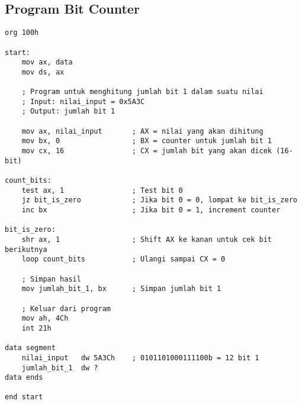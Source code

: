 \documentclass[../main.tex]{subfiles}
\begin{document}
\subsection{Program Bit Counter}
\begin{lstlisting}[language={[x86masm]Assembler}, caption=Program Penghitung Bit, label={lst:bit-counter-program}]
org 100h

start:
    mov ax, data
    mov ds, ax
    
    ; Program untuk menghitung jumlah bit 1 dalam suatu nilai
    ; Input: nilai_input = 0x5A3C
    ; Output: jumlah bit 1
    
    mov ax, nilai_input       ; AX = nilai yang akan dihitung
    mov bx, 0                 ; BX = counter untuk jumlah bit 1
    mov cx, 16                ; CX = jumlah bit yang akan dicek (16-bit)
    
count_bits:
    test ax, 1                ; Test bit 0
    jz bit_is_zero            ; Jika bit 0 = 0, lompat ke bit_is_zero
    inc bx                    ; Jika bit 0 = 1, increment counter
    
bit_is_zero:
    shr ax, 1                 ; Shift AX ke kanan untuk cek bit berikutnya
    loop count_bits           ; Ulangi sampai CX = 0
    
    ; Simpan hasil
    mov jumlah_bit_1, bx      ; Simpan jumlah bit 1
    
    ; Keluar dari program
    mov ah, 4Ch
    int 21h

data segment
    nilai_input   dw 5A3Ch    ; 0101101000111100b = 12 bit 1
    jumlah_bit_1  dw ?
data ends

end start
\end{lstlisting}
\end{document}
